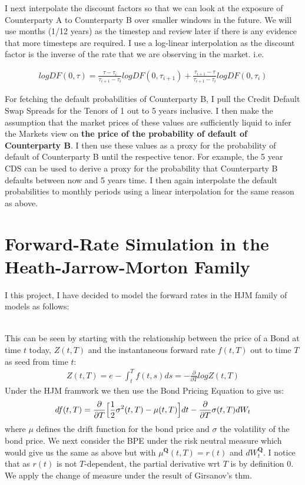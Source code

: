 \documentclass{report}
\theoremstyle{plain}
\theoremstyle{definition}
\begin{document}
I next interpolate the discount factors so that we can look at the exposure of Counterparty A to Counterparty B over smaller windows in the future. We will use months (1/12 years) as the timestep and review later if there is any evidence that more timesteps are required. I use a log-linear interpolation as the discount factor is the inverse of the rate that we are observing in the market. i.e.

\begin{align*}
	logDF(0,\tau) = \frac{\tau - \tau_i}{\tau_{i+1} - \tau_{i}}logDF(0,\tau_{i+1}) + \frac{\tau_{i+1} - \tau}{\tau_{i+1} - \tau_{i}}logDF(0,\tau_{i})
\end{align*}

For fetching the default probabilities of Counterparty B, I pull the Credit Default Swap Spreads for the Tenors of 1 out to 5 years inclusive. I then make the assumption that the market prices of these values are sufficiently liquid to infer the Markets view on \textbf{the price of the probability of default of Counterparty B}. I then use these values as a proxy for the probability of default of Counterparty B until the respective tenor. For example, the 5 year CDS can be used to derive a proxy for the probability that Counterparty B defaults between now and 5 years time.
I then again interpolate the default probabilities to monthly periods using a linear interpolation for the same reason as above.



\pagebreak

\chapter{Forward-Rate Simulation in the Heath-Jarrow-Morton Family}

I this project, I have decided to model the forward rates in the HJM family of models as follows: 

\begin{align*}
\end{align*}

This can be seen by starting with the relationship between the price of a Bond at time $t$ today, $Z(t,T)$ and the instantaneous forward rate $f(t,T)$ out to time $T$ as seed from time $t$:
\begin{align*}
	Z(t,T) = e^{}-\int_t^Tf(t,s)ds = -\frac{\partial}{\partial T}logZ(t,T)
\end{align*}
Under the HJM framwork we then use the Bond Pricing Equation to give us: 
\begin{equation}
	df(t,T) = \frac{\partial}{\partial T}\Big{[}\frac{1}{2}\sigma^2(t,T) - \mu(t,T) \Big{]} dt - \frac{\partial}{\partial T} \sigma(t,T)dW_t
\label{HJM:Update}
\end{equation}
where $\mu$ defines the drift function for the bond price and $\sigma$ the volatility of the bond price. We next consider the BPE under the risk neutral measure which would give us the same as above but with $\mu^{\mathbf{Q}}(t,T) = r(t)$ and $dW_t^{\mathbf{Q}}$. I notice that as $r(t)$ is not $T$-dependent, the partial derivative wrt $T$ is by definition 0. We apply the change of measure under the result of Girsanov's thm.
\end{document}
